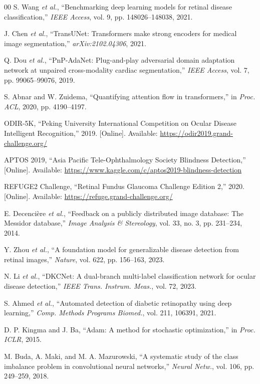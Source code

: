 \documentclass[conference]{IEEEtran}
\begin{document}
\begin{thebibliography}{00}
S. Wang \textit{et al.}, ``Benchmarking deep learning models for retinal disease classification,'' \textit{IEEE Access}, vol. 9, pp. 148026--148038, 2021.

J. Chen \textit{et al.}, ``TransUNet: Transformers make strong encoders for medical image segmentation,'' \textit{arXiv:2102.04306}, 2021.

Q. Dou \textit{et al.}, ``PnP-AdaNet: Plug-and-play adversarial domain adaptation network at unpaired cross-modality cardiac segmentation,'' \textit{IEEE Access}, vol. 7, pp. 99065--99076, 2019.

S. Abnar and W. Zuidema, ``Quantifying attention flow in transformers,'' in \textit{Proc. ACL}, 2020, pp. 4190--4197.

ODIR-5K, ``Peking University International Competition on Ocular Disease Intelligent Recognition,'' 2019. [Online]. Available: \url{https://odir2019.grand-challenge.org/}

APTOS 2019, ``Asia Pacific Tele-Ophthalmology Society Blindness Detection,'' [Online]. Available: \url{https://www.kaggle.com/c/aptos2019-blindness-detection}

REFUGE2 Challenge, ``Retinal Fundus Glaucoma Challenge Edition 2,'' 2020. [Online]. Available: \url{https://refuge.grand-challenge.org/}

E. Decenci\`{e}re \textit{et al.}, ``Feedback on a publicly distributed image database: The Messidor database,'' \textit{Image Analysis \& Stereology}, vol. 33, no. 3, pp. 231--234, 2014.

Y. Zhou \textit{et al.}, ``A foundation model for generalizable disease detection from retinal images,'' \textit{Nature}, vol. 622, pp. 156--163, 2023.

N. Li \textit{et al.}, ``DKCNet: A dual-branch multi-label classification network for ocular disease detection,'' \textit{IEEE Trans. Instrum. Meas.}, vol. 72, 2023.

S. Ahmed \textit{et al.}, ``Automated detection of diabetic retinopathy using deep learning,'' \textit{Comp. Methods Programs Biomed.}, vol. 211, 106391, 2021.

D. P. Kingma and J. Ba, ``Adam: A method for stochastic optimization,'' in \textit{Proc. ICLR}, 2015.

M. Buda, A. Maki, and M. A. Mazurowski, ``A systematic study of the class imbalance problem in convolutional neural networks,'' \textit{Neural Netw.}, vol. 106, pp. 249--259, 2018.


\end{thebibliography}
\end{document}
